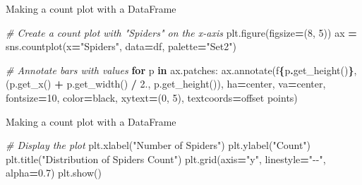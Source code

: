 \documentclass[
  ignorenonframetext,
]{beamer}
\newenvironment{Shaded}{\begin{snugshade}}{\end{snugshade}}
\newcommand{\CommentTok}[1]{\textcolor[rgb]{0.56,0.35,0.01}{\textit{#1}}}
\newcommand{\ControlFlowTok}[1]{\textcolor[rgb]{0.13,0.29,0.53}{\textbf{#1}}}
\newcommand{\DecValTok}[1]{\textcolor[rgb]{0.00,0.00,0.81}{#1}}
\newcommand{\FloatTok}[1]{\textcolor[rgb]{0.00,0.00,0.81}{#1}}
\newcommand{\KeywordTok}[1]{\textcolor[rgb]{0.13,0.29,0.53}{\textbf{#1}}}
\newcommand{\NormalTok}[1]{#1}
\newcommand{\OperatorTok}[1]{\textcolor[rgb]{0.81,0.36,0.00}{\textbf{#1}}}
\newcommand{\SpecialCharTok}[1]{\textcolor[rgb]{0.81,0.36,0.00}{\textbf{#1}}}
\newcommand{\SpecialStringTok}[1]{\textcolor[rgb]{0.31,0.60,0.02}{#1}}
\newcommand{\StringTok}[1]{\textcolor[rgb]{0.31,0.60,0.02}{#1}}
\begin{document}
\begin{frame}[fragile]{Making a count plot with a DataFrame}
\label{making-a-count-plot-with-a-dataframe-3}

\begin{Shaded}
\begin{Highlighting}[]
\CommentTok{\# Create a count plot with "Spiders" on the x{-}axis}
\NormalTok{plt.figure(figsize}\OperatorTok{=}\NormalTok{(}\DecValTok{8}\NormalTok{, }\DecValTok{5}\NormalTok{))}
\NormalTok{ax }\OperatorTok{=}\NormalTok{ sns.countplot(x}\OperatorTok{=}\StringTok{"Spiders"}\NormalTok{, data}\OperatorTok{=}\NormalTok{df, palette}\OperatorTok{=}\StringTok{"Set2"}\NormalTok{)}

\CommentTok{\# Annotate bars with values}
\ControlFlowTok{for}\NormalTok{ p }\KeywordTok{in}\NormalTok{ ax.patches:}
\NormalTok{    ax.annotate(}\SpecialStringTok{f\textquotesingle{}}\SpecialCharTok{\{}\NormalTok{p}\SpecialCharTok{.}\NormalTok{get\_height()}\SpecialCharTok{\}}\SpecialStringTok{\textquotesingle{}}\NormalTok{, }
\NormalTok{                (p.get\_x() }\OperatorTok{+}\NormalTok{ p.get\_width() }\OperatorTok{/} \FloatTok{2.}\NormalTok{, p.get\_height()), }
\NormalTok{                ha}\OperatorTok{=}\StringTok{\textquotesingle{}center\textquotesingle{}}\NormalTok{, va}\OperatorTok{=}\StringTok{\textquotesingle{}center\textquotesingle{}}\NormalTok{, fontsize}\OperatorTok{=}\DecValTok{10}\NormalTok{, color}\OperatorTok{=}\StringTok{\textquotesingle{}black\textquotesingle{}}\NormalTok{, }
\NormalTok{                xytext}\OperatorTok{=}\NormalTok{(}\DecValTok{0}\NormalTok{, }\DecValTok{5}\NormalTok{), textcoords}\OperatorTok{=}\StringTok{\textquotesingle{}offset points\textquotesingle{}}\NormalTok{)}
\end{Highlighting}
\end{Shaded}
\end{frame}

\begin{frame}[fragile]{Making a count plot with a DataFrame}
\label{making-a-count-plot-with-a-dataframe-4}

\begin{Shaded}
\begin{Highlighting}[]

\CommentTok{\# Display the plot}
\NormalTok{plt.xlabel(}\StringTok{"Number of Spiders"}\NormalTok{)}
\NormalTok{plt.ylabel(}\StringTok{"Count"}\NormalTok{)}
\NormalTok{plt.title(}\StringTok{"Distribution of Spiders Count"}\NormalTok{)}
\NormalTok{plt.grid(axis}\OperatorTok{=}\StringTok{"y"}\NormalTok{, linestyle}\OperatorTok{=}\StringTok{"{-}{-}"}\NormalTok{, alpha}\OperatorTok{=}\FloatTok{0.7}\NormalTok{)}
\NormalTok{plt.show()}
\end{Highlighting}
\end{Shaded}
\end{frame}
\end{document}
